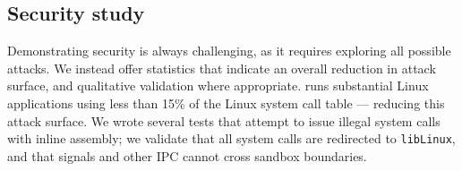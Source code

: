 



\subsection{Security study}


Demonstrating security is always challenging, as it requires exploring all possible attacks.
We instead offer statistics that indicate an overall reduction in attack surface,
and qualitative validation where appropriate.
\graphene{} runs substantial Linux applications using less than 15\% of the
Linux system call table
--- reducing this attack surface.
We wrote several tests that attempt to issue illegal system calls with inline assembly;
we validate that all system calls are redirected to {\tt libLinux},
and that signals and other IPC cannot cross sandbox boundaries.





